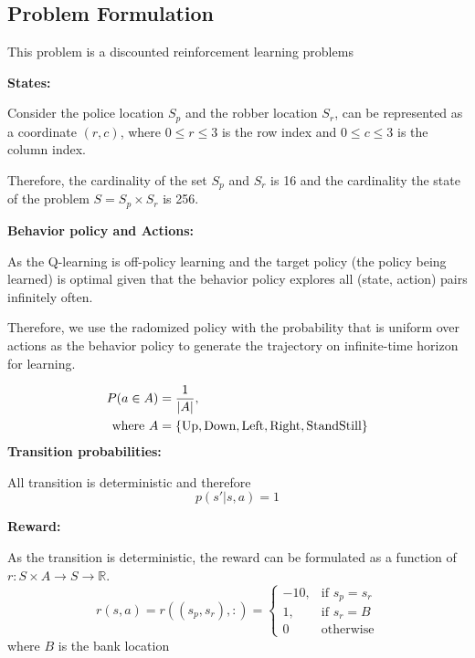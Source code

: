 \documentclass{article}
\begin{document}
\subsection{Problem Formulation}

This problem is a discounted reinforcement learning problems

\textbf{States:}

Consider the police location $S_p$ and the robber location $S_r$, can be represented
as a coordinate $(r, c)$, where $0 \leq r \leq 3$ is the row index and $0 \leq c \leq 3$
is the column index.

Therefore, the cardinality of the set $S_p$ and $S_r$ is 16 and
the cardinality the state of the problem $S = S_p \times S_r$ is 256.

\vspace{0.3cm}

\textbf{Behavior policy and Actions:}

As the Q-learning is off-policy learning and the target policy (the policy being
learned) is optimal given that the behavior policy explores all (state, action) pairs
infinitely often.

Therefore, we use the radomized policy with the probability that is uniform
over actions as the behavior policy to generate the trajectory on infinite-time
horizon for learning.

\begin{align*}
  P(a \in A) &= \frac{1}{|A|}, \\
  \text{where} ~
  A &= \{\textup{Up},\textup{Down},\textup{Left},\textup{Right},\textup{StandStill}\}
\end{align*}
\textbf{Transition probabilities:}

All transition is deterministic and therefore
\begin{equation*}
  p(s' | s, a) = 1
\end{equation*}

\textbf{Reward:}

As the transition is deterministic,
the reward can be formulated as a function of $r: S\times A \rightarrow S \rightarrow \mathbb{R}$.
\begin{equation*}
  r(s, a) = r((s_p, s_r), :) =
\begin{cases}
    -10 ,& \text{if } s_p = s_r\\
    1,   & \text{if } s_r = B\\
    0    & \text{otherwise}
\end{cases}
\end{equation*}
where $B$ is the bank location
\end{document}
